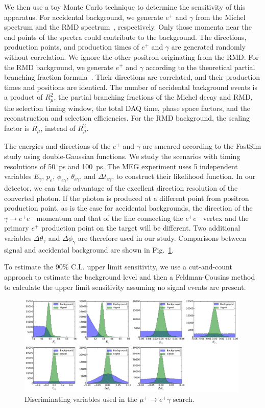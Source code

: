 We then use a toy Monte Carlo technique to determine the sensitivity of this
apparatus.
For accidental background, we generate $e^+$ and $\gamma$ from the Michel
spectrum and the RMD spectrum~\cite{Kuno:1999jp}, respectively. Only those momenta
near the end points of the spectra could contribute to the background.
The directions, production points, and production times of $e^+$ and 
$\gamma$ are generated
randomly without correlation. We ignore the other positron originating from the RMD.
For the RMD background, we generate $e^+$ and $\gamma$ according to the theoretical
partial branching fraction formula~\cite{Kuno:1999jp}. Their directions are
correlated, and their production times and positions are identical.
The number of accidental background events is a product of $R_\mu^2$, the partial
branching fractions of the Michel decay and RMD, the selection timing window, the
total DAQ time, phase space factors, and the reconstruction and selection 
efficiencies. For the RMD background, the scaling factor is $R_\mu$, instead of
$R_\mu^2$.

The energies and directions
of the $e^+$ and $\gamma$ are smeared according to the FastSim study
using double-Gaussian functions.
We study the scenarios with timing resolutions of 50~ps and 100~ps. 
The MEG experiment uses 5 independent variables $E_\gamma$, $p_e$, 
$\phi_{e\gamma}$, $\theta_{e\gamma}$, and $\Delta t_{e\gamma}$, to construct
their likelihood function. In our detector, we can take advantage of the excellent
direction resolution of the converted photon. If the photon is produced
at a different point from positron production point, as is the case for accidental backgrounds,
the direction of the $\gamma\to e^+e^-$ momentum and that of the line
connecting the $e^+e^-$ vertex and the primary $e^+$ production point on the target
will be different.  Two additional variables $\Delta\theta_\gamma$ 
and $\Delta\phi_\gamma$ are therefore used in our study. Comparisons between signal
and accidental background are shown in Fig.~\ref{fig:muegamma-vars}.

To estimate the 90\% C.L. upper limit sensitivity, we use a cut-and-count
approach to estimate the background level and then a Feldman-Cousins 
method~\cite{Feldman:1997qc} to calculate the upper limit sensitivity assuming
no signal events are present.



\begin{figure}[htbp]
\includegraphics[width=0.99\textwidth]{Figures/sens-vardists-50ps.pdf}
\caption{Discriminating variables used in the $\mu^+\to e^+\gamma$ search.}
\label{fig:muegamma-vars}
\end{figure}

